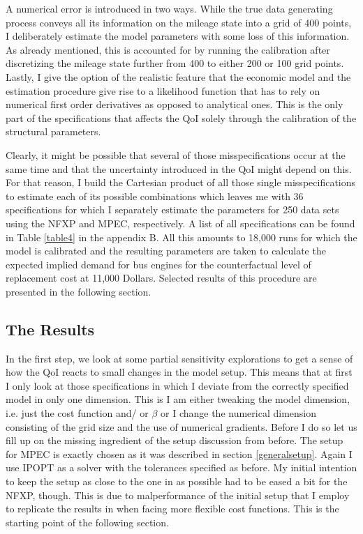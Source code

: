 A numerical error is introduced in two ways. While the true data generating process conveys all its information on the mileage state into a grid of 400 points, I deliberately estimate the model parameters with some loss of this information. As already mentioned, this is accounted for by running the calibration after discretizing the mileage state further from 400 to either 200 or 100 grid points. Lastly, I give the option of the realistic feature that the economic model and the estimation procedure give rise to a likelihood function that has to rely on numerical first order derivatives as opposed to analytical ones. This is the only part of the specifications that affects the QoI solely through the calibration of the structural parameters.

Clearly, it might be possible that several of those misspecifications occur at the same time and that the uncertainty introduced in the QoI might depend on this. For that reason, I build the Cartesian product of all those single misspecifications to estimate each of its possible combinations which leaves me with 36 specifications for which I separately estimate the parameters for 250 data sets using the NFXP and MPEC, respectively. A list of all specifications can be found in Table \ref{table4} in the appendix B. All this amounts to 18,000 runs for which the model is calibrated and the resulting parameters are taken to calculate the expected implied demand for bus engines for the counterfactual level of replacement cost at 11,000 Dollars. Selected results of this procedure are presented in the following section.

\subsection{The Results}

In the first step, we look at some partial sensitivity explorations to get a sense of how the QoI reacts to small changes in the model setup. This means that at first I only look at those specifications in which I deviate from the correctly specified model in only one dimension. This is I am either tweaking the model dimension, i.e. just the cost function and/ or $\beta$ or I change the numerical dimension consisting of the grid size and the use of numerical gradients. Before I do so let us fill up on the missing ingredient of the setup discussion from before. The setup for MPEC is exactly chosen as it was described in section \ref{generalsetup}. Again I use IPOPT as a solver with the tolerances specified as before. My initial intention to keep the setup as close to the one in \cite{Iskhakov.2016} as possible had to be eased a bit for the NFXP, though. This is due to malperformance of the initial setup that I employ to replicate the results in \cite{Iskhakov.2016} when facing more flexible cost functions. This is the starting point of the following section.

